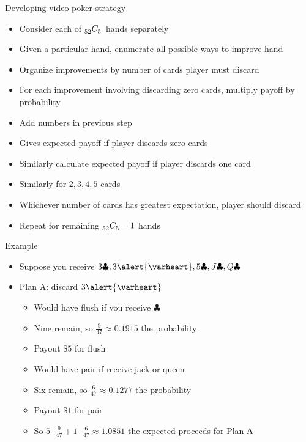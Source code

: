 \documentclass[handout,xcolor=dvipsnames]{beamer}
\theoremstyle{definition}
\newcommand\ncr[2]{\tensor[_{#1}]C{_{#2}}}
\newcommand{\hs}{\alert{\varheart}}
\newcommand{\cs}{\clubsuit}
\begin{document}
\begin{frame}{Developing video poker strategy}
\begin{itemize}
\item Consider each of $\ncr{52}{5}$ hands separately
\item Given a particular hand, enumerate
all possible ways to improve hand
\item Organize improvements by number of cards player
must discard
\item For each improvement involving discarding zero cards,
multiply payoff by probability
\item Add numbers in previous step
\item Gives expected payoff if player discards zero cards
\item Similarly calculate expected payoff
if player discards one card
\item Similarly for $2,3,4,5$ cards
\item Whichever number of cards has greatest
expectation, player should discard
\item Repeat for remaining $\ncr{52}{5}-1$ hands
\end{itemize}
\end{frame}

\begin{frame}{Example}
\begin{itemize}
\item Suppose you receive
$3\cs,3\hs,5\cs,J\cs,Q\cs$
\item Plan A: discard $3\hs$
\begin{itemize}
\item Would have flush if you receive $\cs$
\item Nine remain, so $\frac{9}{47}\approx
0.1915$ the probability
\item Payout $\$5$ for flush
\item Would have pair if receive jack or queen
\item Six remain, so $\frac{6}{47}\approx 0.1277$
the probability
\item Payout $\$1$ for pair
\item So $5\cdot\frac{9}{47}+1\cdot\frac{6}{47}
\approx 1.0851$ the expected proceeds for Plan A
\end{itemize}
\end{itemize}
\end{frame}
\end{document}
